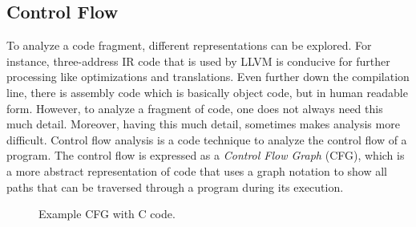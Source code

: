 \subsection{Control Flow}\label{sec:control_flow_graph}
To analyze a code fragment, different representations can be explored. For instance, three-address IR code that is used by LLVM is conducive for further processing like optimizations and translations. Even further down the compilation line, there is assembly code which is basically object code, but in human readable form. However, to analyze a fragment of code, one does not always need this much detail. Moreover, having this much detail, sometimes makes analysis more difficult. Control flow analysis is a code technique to analyze the control flow of a program. The control flow is expressed as a \emph{Control Flow Graph} (CFG), which is a more abstract representation of code that uses a graph notation to show all paths that can be traversed through a program during its execution.  

\begin{figure}[H]
\centering
{}\quad\quad
{}
\hfill
\caption{Example CFG with C code.}
\label{fig:cfg}
\end{figure}

